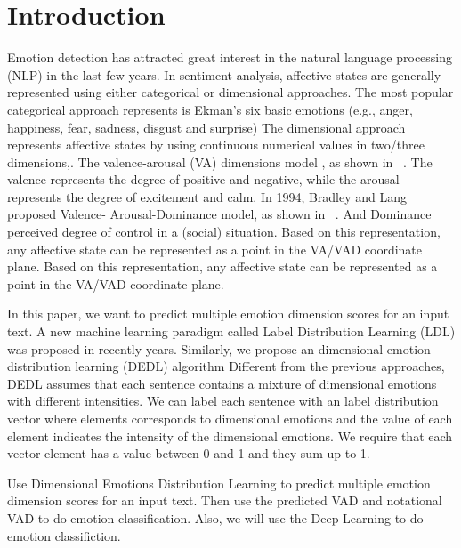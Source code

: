 \section{Introduction}\label{sec-intro}


Emotion detection has attracted great interest 
in the natural language processing (NLP)
in the last few years.
In sentiment analysis, 
affective states are generally represented 
using either categorical or dimensional approaches.
The most popular categorical approach represents is 
Ekman’s six basic emotions 
(e.g., anger, happiness, fear, sadness, disgust and surprise)
The dimensional approach represents affective states by using
continuous numerical values in two/three dimensions,.
The valence-arousal (VA) dimensions model , 
as shown in ~. 
The valence represents the degree of 
positive and negative, 
while the arousal represents the degree of 
excitement and calm. 
In 1994,
Bradley and Lang proposed 
Valence- Arousal-Dominance model,
as shown in ~.
And Dominance perceived degree of control in a (social) situation.
Based on this representation, 
any affective state can be represented as a point 
in the VA/VAD coordinate plane. 
Based on this representation, 
any affective state can be represented as 
a point in the VA/VAD coordinate plane.

In this paper, 
we want to predict  
multiple emotion dimension scores for an input text.
A new machine learning paradigm called 
Label Distribution Learning (LDL) 
was proposed in recently years.
Similarly,
we propose an dimensional emotion distribution learning (DEDL) algorithm
Different from the previous approaches, 
DEDL assumes that
each sentence contains a mixture of 
dimensional emotions with different intensities. 
We can label each sentence with 
an label distribution vector 
where elements corresponds to 
dimensional emotions and 
the value of each element indicates the intensity of the dimensional emotions. 
We require that each vector element has a value 
between 0 and 1 and they sum up to 1.

Use Dimensional Emotions Distribution Learning
to predict multiple emotion dimension scores for an input text.
Then use the predicted VAD and notational VAD to 
do emotion classification.
Also, 
we will use the Deep Learning to do emotion classifiction.

